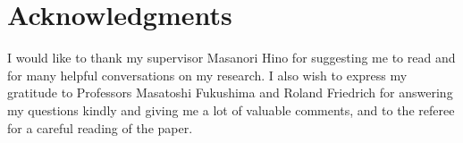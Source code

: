 \documentclass[preprint,12pt]{elsarticle}
\theoremstyle{definition}
\begin{document}
\section*{Acknowledgments}
I would like to thank my supervisor Masanori Hino
for suggesting me to read \cite{CFR16} and
for many helpful conversations on my research.
I also wish to express my gratitude to Professors Masatoshi Fukushima and
Roland Friedrich for answering my questions kindly and
giving me a lot of valuable comments,
and to the referee for a careful reading of the paper.


\end{document}
